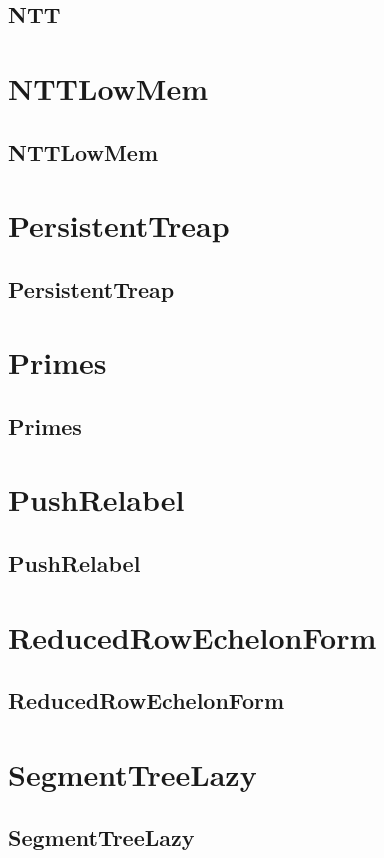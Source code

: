 \documentclass[a4paper, twocolumn]{article}
\begin{document}
\subsection{NTT}

\section{NTTLowMem}
\subsection{NTTLowMem}

\section{PersistentTreap}
\subsection{PersistentTreap}

\section{Primes}
\subsection{Primes}

\section{PushRelabel}
\subsection{PushRelabel}

\section{ReducedRowEchelonForm}
\subsection{ReducedRowEchelonForm}

\section{SegmentTreeLazy}
\subsection{SegmentTreeLazy}

\end{document}
